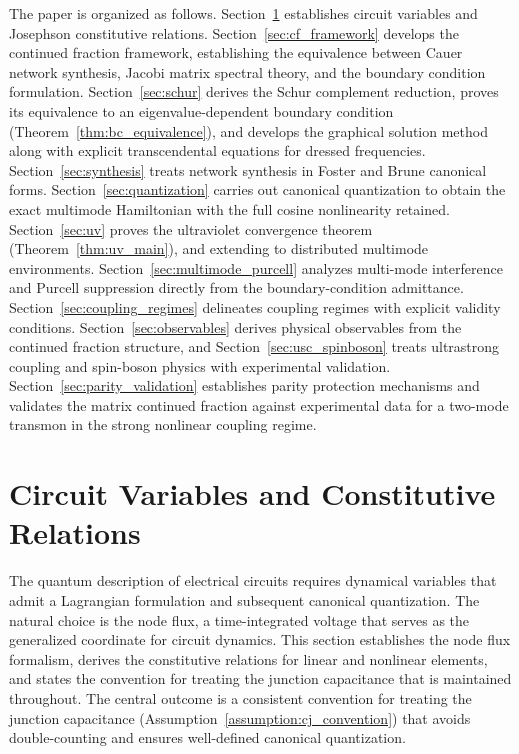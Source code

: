 \documentclass[reprint, floatfix, superscriptaddress, amsmath, amssymb, longbibliography]{revtex4-2}
\begin{document}
The paper is organized as follows. Section~\ref{sec:circuit_variables} establishes circuit variables and Josephson constitutive relations. Section~\ref{sec:cf_framework} develops the continued fraction framework, establishing the equivalence between Cauer network synthesis, Jacobi matrix spectral theory, and the boundary condition formulation. Section~\ref{sec:schur} derives the Schur complement reduction, proves its equivalence to an eigenvalue-dependent boundary condition (Theorem~\ref{thm:bc_equivalence}), and develops the graphical solution method along with explicit transcendental equations for dressed frequencies. Section~\ref{sec:synthesis} treats network synthesis in Foster and Brune canonical forms. Section~\ref{sec:quantization} carries out canonical quantization to obtain the exact multimode Hamiltonian with the full cosine nonlinearity retained. Section~\ref{sec:uv} proves the ultraviolet convergence theorem (Theorem~\ref{thm:uv_main}), and extending to distributed multimode environments. Section~\ref{sec:multimode_purcell} analyzes multi-mode interference and Purcell suppression directly from the boundary-condition admittance. Section~\ref{sec:coupling_regimes} delineates coupling regimes with explicit validity conditions. Section~\ref{sec:observables} derives physical observables from the continued fraction structure, and Section~\ref{sec:usc_spinboson} treats ultrastrong coupling and spin-boson physics with experimental validation. Section~\ref{sec:parity_validation} establishes parity protection mechanisms and validates the matrix continued fraction against experimental data for a two-mode transmon in the strong nonlinear coupling regime.


\section{Circuit Variables and Constitutive Relations}
\label{sec:circuit_variables}

The quantum description of electrical circuits requires dynamical variables that admit a Lagrangian formulation and subsequent canonical quantization. The natural choice is the node flux, a time-integrated voltage that serves as the generalized coordinate for circuit dynamics. This section establishes the node flux formalism, derives the constitutive relations for linear and nonlinear elements, and states the convention for treating the junction capacitance that is maintained throughout. The central outcome is a consistent convention for treating the junction capacitance (Assumption~\ref{assumption:cj_convention}) that avoids double-counting and ensures well-defined canonical quantization.
\end{document}
